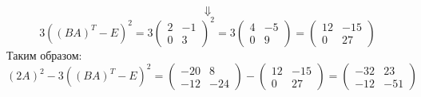 \documentclass{article}
\begin{document}
$$\Downarrow$$
$$3((BA)^T-E)^2=3\left(\begin{array}{rr}2 & -1\\0 & 3\end{array}\right)^2=3\left(\begin{array}{rr}4 & -5\\0 & 9\end{array}\right)=\left(\begin{array}{rr}12 & -15\\0 & 27\end{array}\right)$$
Таким образом:
$$(2A)^2-3((BA)^T-E)^2=\left(\begin{array}{rr}-20 & 8\\-12 & -24\end{array}\right)-\left(\begin{array}{rr}12 & -15\\0 & 27\end{array}\right)=\left(\begin{array}{rr}-32 & 23\\-12 & -51\end{array}\right)$$
\end{document}
